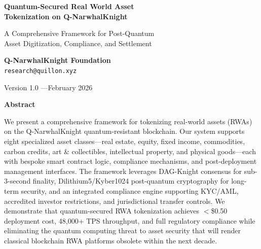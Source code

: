 \documentclass[11pt,a4paper,twoside]{article}
\begin{document}
\begin{titlepage}
\begin{center}
\vspace*{2cm}


\vspace{1cm}

{\Huge\bfseries\color{sectionblue} Quantum-Secured Real World Asset\\[0.3em]
Tokenization on Q-NarwhalKnight}

\vspace{0.8cm}

{\Large\color{qnkgold} A Comprehensive Framework for Post-Quantum\\[0.2em]
Asset Digitization, Compliance, and Settlement}

\vspace{1.5cm}

{\large
\textbf{Q-NarwhalKnight Foundation}\\[0.3em]
\texttt{research@quillon.xyz}
}

\vspace{1cm}

{\large Version 1.0 \quad---\quad February 2026}

\vspace{2cm}

\begin{tcolorbox}[
  colback=qnkdark,
  colframe=qnkgold,
  width=0.85\textwidth,
  arc=4mm,
  boxrule=1pt
]
\color{white}
\begin{center}
\textbf{Abstract}
\end{center}
\small
We present a comprehensive framework for tokenizing real-world assets (RWAs) on the Q-NarwhalKnight quantum-resistant blockchain. Our system supports eight specialized asset classes---real estate, equity, fixed income, commodities, carbon credits, art \& collectibles, intellectual property, and physical goods---each with bespoke smart contract logic, compliance mechanisms, and post-deployment management interfaces. The framework leverages DAG-Knight consensus for sub-3-second finality, Dilithium5/Kyber1024 post-quantum cryptography for long-term security, and an integrated compliance engine supporting KYC/AML, accredited investor restrictions, and jurisdictional transfer controls. We demonstrate that quantum-secured RWA tokenization achieves $<$\$0.50 deployment cost, 48,000+ TPS throughput, and full regulatory compliance while eliminating the quantum computing threat to asset security that will render classical blockchain RWA platforms obsolete within the next decade.
\end{tcolorbox}


\end{center}
\end{titlepage}
\end{document}
